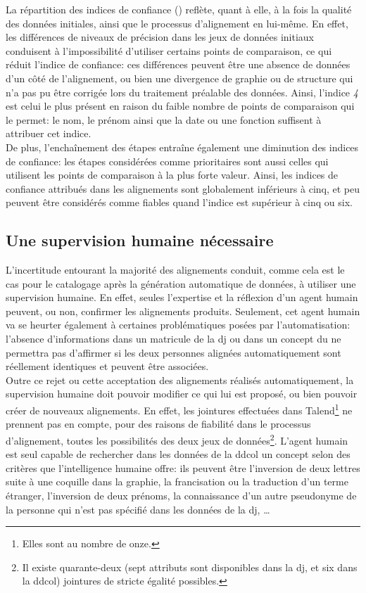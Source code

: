 La répartition des indices de confiance () reflète, quant à elle, à la fois la qualité des données initiales, ainsi que le processus d'alignement en lui-même. En effet, les différences de niveaux de précision dans les jeux de données initiaux conduisent à l'impossibilité d'utiliser certains points de comparaison, ce qui réduit l'indice de confiance: ces différences peuvent être une absence de données d'un côté de l'alignement, ou bien une divergence de graphie ou de structure qui n'a pas pu être corrigée lors du traitement préalable des données. Ainsi, l'indice \textit{4} est celui le plus présent en raison du faible nombre de points de comparaison qui le permet: le nom, le prénom ainsi que la date ou une fonction suffisent à attribuer cet indice.\\

De plus, l'enchaînement des étapes entraîne également une diminution des indices de confiance: les étapes considérées comme prioritaires sont aussi celles qui utilisent les points de comparaison à la plus forte valeur. Ainsi, les indices de confiance attribués dans les alignements sont globalement inférieurs à cinq, et peu peuvent être considérés comme fiables quand l'indice est supérieur à cinq ou six.

\subsection{\label{III-C-3-b}Une supervision humaine nécessaire}

L'incertitude entourant la majorité des alignements conduit, comme cela est le cas pour le catalogage après la génération automatique de données, à utiliser une supervision humaine. En effet, seules l'expertise et la réflexion d'un agent humain peuvent, ou non, confirmer les alignements produits. Seulement, cet agent humain va se heurter également à certaines problématiques posées par l'automatisation: l'absence d'informations dans un matricule de la \ac{dj} ou dans un concept du \ldd ne permettra pas d'affirmer si les deux personnes alignées automatiquement sont réellement identiques et peuvent être associées.\\

Outre ce rejet ou cette acceptation des alignements réalisés automatiquement, la supervision humaine doit pouvoir modifier ce qui lui est proposé, ou bien pouvoir créer de nouveaux alignements. En effet, les jointures effectuées dans Talend\footnote{Elles sont au nombre de onze.} ne prennent pas en compte, pour des raisons de fiabilité dans le processus d'alignement, toutes les possibilités des deux jeux de données\footnote{Il existe quarante-deux (sept attributs sont disponibles dans la \ac{dj}, et six dans la \ac{ddcol}) jointures de stricte égalité possibles.}. L'agent humain est seul capable de rechercher dans les données de la \ac{ddcol} un concept selon des critères que l'intelligence humaine offre: ils peuvent être l'inversion de deux lettres suite à une coquille dans la graphie, la francisation ou la traduction d'un terme étranger, l'inversion de deux prénoms, la connaissance d'un autre pseudonyme de la personne qui n'est pas spécifié dans les données de la \ac{dj}, \dots

